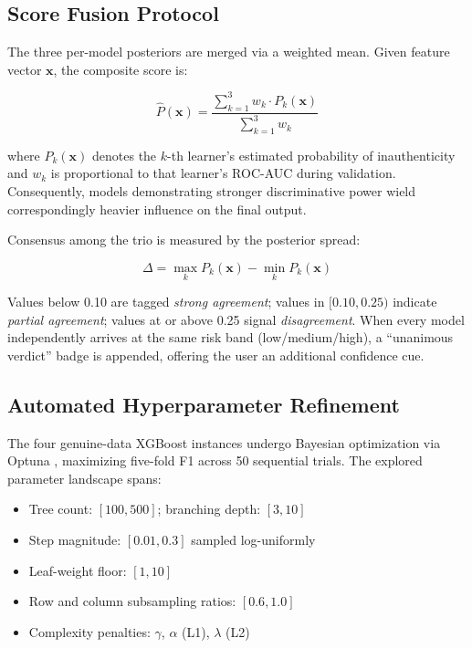 \documentclass[conference]{IEEEtran}
\begin{document}
\subsection{Score Fusion Protocol}

The three per-model posteriors are merged via a weighted mean. Given feature vector $\mathbf{x}$, the composite score is:

\begin{equation}
\hat{P}(\mathbf{x}) = \frac{\sum_{k=1}^{3} w_k \cdot P_k(\mathbf{x})}{\sum_{k=1}^{3} w_k}
\end{equation}

\noindent where $P_k(\mathbf{x})$ denotes the $k$-th learner's estimated probability of inauthenticity and $w_k$ is proportional to that learner's ROC-AUC during validation. Consequently, models demonstrating stronger discriminative power wield correspondingly heavier influence on the final output.

Consensus among the trio is measured by the posterior spread:

\begin{equation}
\Delta = \max_k P_k(\mathbf{x}) - \min_k P_k(\mathbf{x})
\end{equation}

\noindent Values below 0.10 are tagged \textit{strong agreement}; values in $[0.10, 0.25)$ indicate \textit{partial agreement}; values at or above 0.25 signal \textit{disagreement}. When every model independently arrives at the same risk band (low/medium/high), a ``unanimous verdict'' badge is appended, offering the user an additional confidence cue.

\subsection{Automated Hyperparameter Refinement}

The four genuine-data XGBoost instances undergo Bayesian optimization via Optuna \cite{akiba2019optuna}, maximizing five-fold F1 across 50 sequential trials. The explored parameter landscape spans:

\begin{itemize}
    \item Tree count: $[100, 500]$; branching depth: $[3, 10]$
    \item Step magnitude: $[0.01, 0.3]$ sampled log-uniformly
    \item Leaf-weight floor: $[1, 10]$
    \item Row and column subsampling ratios: $[0.6, 1.0]$
    \item Complexity penalties: $\gamma$, $\alpha$ (L1), $\lambda$ (L2)
\end{itemize}
\end{document}
